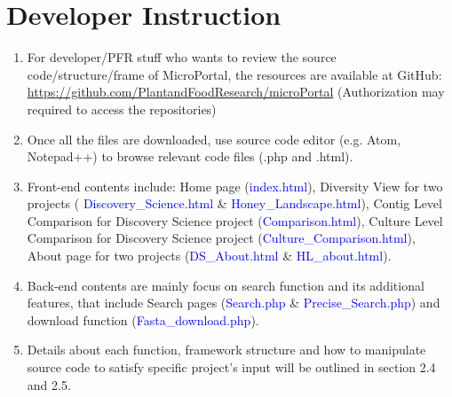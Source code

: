 \documentclass{scrreprt}
\begin{document}
\section{Developer Instruction}
\begin{enumerate}
\item For developer/PFR stuff who wants to review the source code/structure/frame of MicroPortal, the resources are available at GitHub: 
\newline
\url{https://github.com/PlantandFoodResearch/microPortal}
\newline
(Authorization may required to access the repositories)
\item Once all the files are downloaded, use source code editor (e.g. Atom, Notepad++) to browse relevant code files (.php and .html).
\newline
\item 
Front-end contents include: Home page (\textcolor{blue}{index.html}), Diversity View for two projects ( \textcolor{blue}{Discovery\_Science.html} \& \textcolor{blue}{Honey\_Landscape.html}), Contig Level Comparison for Discovery Science project (\textcolor{blue}{Comparison.html}), Culture Level Comparison for Discovery Science project (\textcolor{blue}{Culture\_Comparison.html}), About page for two projects (\textcolor{blue}{DS\_About.html} \& \textcolor{blue}{HL\_about.html}).
\item
Back-end contents are mainly focus on search function and its additional features, that include Search pages (\textcolor{blue}{Search.php} \& \textcolor{blue}{Precise\_Search.php}) and download function (\textcolor{blue}{Fasta\_download.php}).
\item 
Details about each function, framework structure and how to manipulate source code to satisfy specific project's input will be outlined in section 2.4 and 2.5.
\end{enumerate}
\end{document}
